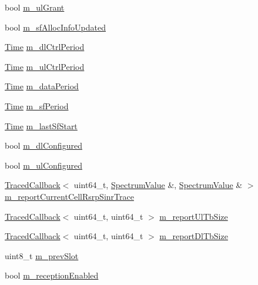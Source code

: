 \begin{DoxyCompactItemize}
\item 
bool \hyperlink{classns3_1_1MmWaveUePhy_a9c9ef40f80c74bd52b92b76889b44e14}{m\+\_\+ul\+Grant}
\item 
bool \hyperlink{classns3_1_1MmWaveUePhy_aa8bc6a16008a27abda07661f9bab1fcf}{m\+\_\+sf\+Alloc\+Info\+Updated}
\item 
\hyperlink{classns3_1_1Time}{Time} \hyperlink{classns3_1_1MmWaveUePhy_a68378d3e8535eaf7cd322a81b26267fb}{m\+\_\+dl\+Ctrl\+Period}
\item 
\hyperlink{classns3_1_1Time}{Time} \hyperlink{classns3_1_1MmWaveUePhy_ab520b977b7daeef8288ad4d00faf65a7}{m\+\_\+ul\+Ctrl\+Period}
\item 
\hyperlink{classns3_1_1Time}{Time} \hyperlink{classns3_1_1MmWaveUePhy_ae1476ef2a59d271b03aa0b9166bbfcd6}{m\+\_\+data\+Period}
\item 
\hyperlink{classns3_1_1Time}{Time} \hyperlink{classns3_1_1MmWaveUePhy_a2d10507fb1cd49d8753fd4839337dec7}{m\+\_\+sf\+Period}
\item 
\hyperlink{classns3_1_1Time}{Time} \hyperlink{classns3_1_1MmWaveUePhy_a162b30346c93b63bb74d9ab142c1a0d5}{m\+\_\+last\+Sf\+Start}
\item 
bool \hyperlink{classns3_1_1MmWaveUePhy_a18c8fe6348894ec7241b0eebf34652e2}{m\+\_\+dl\+Configured}
\item 
bool \hyperlink{classns3_1_1MmWaveUePhy_a2d4afba193fb2ef5aabc7c4a0beb129c}{m\+\_\+ul\+Configured}
\item 
\hyperlink{classns3_1_1TracedCallback}{Traced\+Callback}$<$ uint64\+\_\+t, \hyperlink{classns3_1_1SpectrumValue}{Spectrum\+Value} \&, \hyperlink{classns3_1_1SpectrumValue}{Spectrum\+Value} \& $>$ \hyperlink{classns3_1_1MmWaveUePhy_a5c7ac135bd3be4b3cc9fbb14a49961e3}{m\+\_\+report\+Current\+Cell\+Rsrp\+Sinr\+Trace}
\item 
\hyperlink{classns3_1_1TracedCallback}{Traced\+Callback}$<$ uint64\+\_\+t, uint64\+\_\+t $>$ \hyperlink{classns3_1_1MmWaveUePhy_af182f14fb53bb3fea59e51d420fe0489}{m\+\_\+report\+Ul\+Tb\+Size}
\item 
\hyperlink{classns3_1_1TracedCallback}{Traced\+Callback}$<$ uint64\+\_\+t, uint64\+\_\+t $>$ \hyperlink{classns3_1_1MmWaveUePhy_aa64fc9fd78f026c8792d91b12c6b40d7}{m\+\_\+report\+Dl\+Tb\+Size}
\item 
uint8\+\_\+t \hyperlink{classns3_1_1MmWaveUePhy_a4362319ab1aa94b21e8f45639ea21226}{m\+\_\+prev\+Slot}
\item 
bool \hyperlink{classns3_1_1MmWaveUePhy_a3ce209682bac7903e014ea63df3cf0f5}{m\+\_\+reception\+Enabled}
\item 

\end{DoxyCompactItemize}
